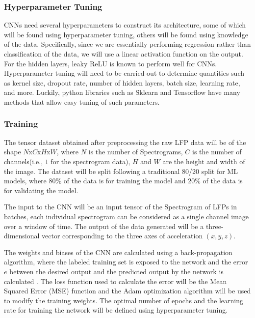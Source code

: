 \documentclass[12pt]{article}
\begin{document}
\subsubsection{Hyperparameter Tuning}

CNNs need several hyperparameters to construct its architecture, some of which will be found using hyperparameter tuning, others will be found using knowledge of the data. Specifically, since we are essentially performing regression rather than classification of the data, we will use a linear activation function on the output. For the hidden layers, leaky ReLU is known to perform well for CNNs. Hyperparameter tuning will need to be carried out to determine quantities such as kernel size, dropout rate, number of hidden layers, batch size, learning rate, and more. Luckily, python libraries such as Sklearn and Tensorflow have many methods that allow easy tuning of such parameters.

\subsubsection{Training} 

The tensor dataset obtained after preprocessing the raw LFP data will be of the shape $N$x$C$x$H$x$W$, where $N$ is the number of Spectrograms, $C$ is the number of channels(i.e., $1$ for the spectrogram data), $H$ and $W$ are the height and width of the image. The dataset will be split following a traditional 80/20 split for ML models, where 80\% of the data is for training the model and 20\% of the data is for validating the model.

The input to the CNN will be an input tensor of the Spectrogram of LFPs in batches, each individual spectrogram can be considered as a single channel image over a window of time. The output of the data generated will be a three-dimensional vector corresponding to the three axes of acceleration $(x, y, z)$.

The weights and biases of the CNN are calculated using a back-propagation algorithm, where the labeled training set is exposed to the network and the error $e$ between the desired output and the predicted output by the network is calculated \cite{hecht1992}. The loss function used to calculate the error will be the Mean Squared Error (MSE) function and the Adam optimization algorithm will be used to modify the training weights. The optimal number of epochs and the learning rate for training the network will be defined using hyperparameter tuning.
\end{document}

